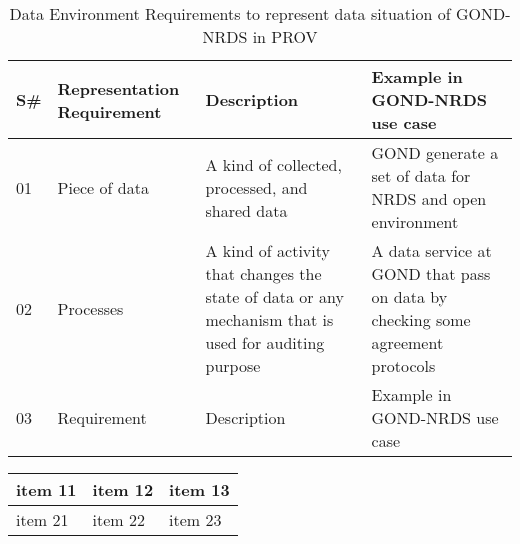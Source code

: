 \begin{comment}
For example, the data environment representation (i.e provenance graph) should be able to answer that: Who are the data subjects, data controllers, and data processors. How Long the data is controlled and processed by the controller and processor in the specific life cycle of data. How it is expected that the data to be used by receiving environment. The provenance graph should also be able to answer that What kind of data the data controller has about the data subjects, e.g. statistics, text and etc. At what level  of information the data provide about the data subjects e.g. microdata, aggregated and etc.  Does the provenance contains  the information of properties of the dataset are, e.g. age, quality, etc.  Further, the representation of data environment should contain information    Where the data is controlled, processed; When the data is deleted permanently by data controller or processor  and to what extent the data subjects are aware of data situation (i.e. controlling, processing, deleting involved in the data lifetime). To understand these requirements lets take a more complex use 
\end{comment}



\begin{table}
\caption{Data Environment Requirements to represent data situation of GOND-NRDS in PROV}\label{tab1}
\begin{tabular}{|l|l|l|l|}
\hline
\textbf{S\#} &  \textbf{Representation Requirement}  &  \textbf{Description}  &  \textbf{Example in GOND-NRDS use case} \\
\hline
01 &  Piece of data  &  A kind of collected, processed, and shared data  &  GOND generate a set of data for NRDS and open environment \\
\hline

02 &  Processes  &  A kind of activity that changes the state of data  or any mechanism that is used for auditing purpose &  A data service at GOND that pass on data by checking some agreement protocols \\
\hline

03 &  Requirement  &  Description  &  Example in GOND-NRDS use case \\
\hline

\end{tabular}
\end{table}


\begin{tabularx}{0.8\textwidth} { 
  | >{\raggedright\arraybackslash}X 
  | >{\centering\arraybackslash}X 
  | >{\raggedleft\arraybackslash}X | }
 \hline
 item 11 & item 12 & item 13 \\
 \hline
 item 21  & item 22  & item 23  \\
\hline
\end{tabularx}





